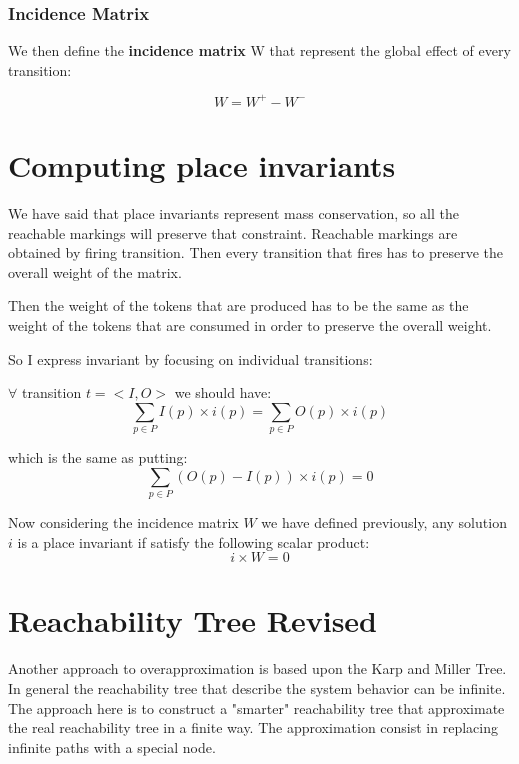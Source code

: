 \subsubsection{Incidence Matrix}
We then define the \textbf{incidence matrix} W that represent the global effect of every transition:

\begin{equation*}
    W = W^{+} - W^{-}
\end{equation*}

\section{Computing place invariants}
We have said that place invariants represent mass conservation, so all the reachable markings will preserve that constraint. Reachable markings are obtained by firing transition. Then every transition that fires has to preserve the overall weight of the matrix.\par
Then the weight of the tokens that are produced has to be the same as the weight of the tokens that are consumed in order to preserve the overall weight.\par
So I express invariant by focusing on individual transitions:\par
$\forall$ transition $t = <I, O>$ we should have:
\begin{equation*}
    \sum_{p \in P} I(p) \times i(p) = \sum_{p \in P}O(p) \times i(p)
\end{equation*}

which is the same as putting:
\begin{equation*}
    \sum_{p \in P} (O(p) - I(p)) \times i(p) = 0
\end{equation*}

Now considering the incidence matrix $W$ we have defined previously, any solution $i$ is a place invariant if satisfy the following scalar product:
\begin{equation*}
    i \times W = 0
\end{equation*}

\section{Reachability Tree Revised}
Another approach to overapproximation is based upon the Karp and Miller Tree. In general the reachability tree that describe the system behavior can be infinite. The approach here is to construct a "smarter" reachability tree that approximate the real reachability tree in a finite way. The approximation consist in replacing infinite paths with a special node.

